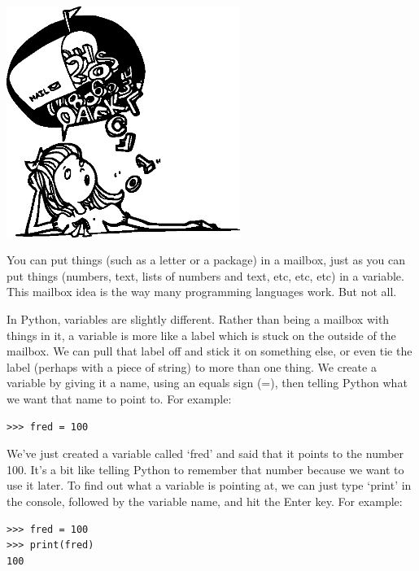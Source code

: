 \begin{center}
\includegraphics*[width=76mm]{girlbubble.eps}
\end{center}

You can put things (such as a letter or a package) in a mailbox, just as you can put things (numbers, text, lists of numbers and text, etc, etc, etc) in a variable.  This mailbox idea is the way many programming languages work.  But not all.

In Python, variables are slightly different.  Rather than being a mailbox with things in it, a variable is more like a label which is stuck on the outside of the mailbox.  We can pull that label off and stick it on something else, or even tie the label (perhaps with a piece of string) to more than one thing. We create a variable by giving it a name, using an equals sign (=), then telling Python what we want that name to point to.  For example:

\begin{listing}
\begin{verbatim}
>>> fred = 100
\end{verbatim}
\end{listing}

We've just created a variable called `fred' and said that it points to the number 100.  It's a bit like telling Python to remember that number because we want to use it later.  To find out what a variable is pointing at, we can just type `print' in the console, followed by the variable name, and hit the Enter key.  For example:

\begin{listing}
\begin{verbatim}
>>> fred = 100
>>> print(fred)
100
\end{verbatim}
\end{listing}


